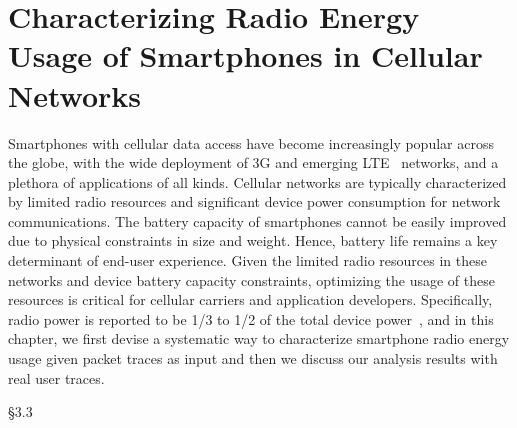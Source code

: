 \chapter{Characterizing Radio Energy Usage of Smartphones in Cellular Networks} 
\label{chap:power}

Smartphones with cellular data access have become increasingly popular across the globe, with the wide deployment of 3G and emerging LTE~\cite{3gpp.lte} networks, and a plethora of applications of all kinds. Cellular networks are typically characterized by limited radio resources and significant device power consumption for network communications. The battery capacity of smartphones cannot be easily improved due to physical constraints in size and weight. Hence, battery life remains a key determinant of end-user experience. Given the limited radio resources in these networks and device battery capacity constraints, optimizing the usage of these resources is critical for cellular carriers and application developers. Specifically, radio power is reported to be 1/3 to 1/2 of the total device power~\cite{mobisys.aro}, and in this chapter, we first devise a systematic way to characterize smartphone radio energy usage given packet traces as input and then we discuss our analysis results with real user traces.




\S3.3

